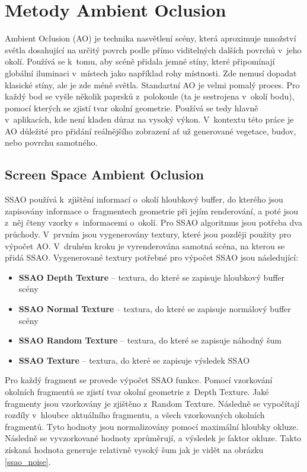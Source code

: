 \section{Metody Ambient Oclusion}
Ambient Oclusion (AO) je technika nasvětlení scény, která aproximuje množství světla dosahující na určitý povrch podle přímo viditelných dalších povrchů v~jeho okolí. Používá se k~tomu, aby scéně přidala jemné stíny, které připomínají  globální iluminaci v~místech jako například rohy místnosti. Zde nemusí dopadat klasické stíny, ale je zde méně světla. Standartní AO je velmi pomalý proces. Pro každý bod se vyšle několik paprsků z~polokoule (ta je sestrojena v~okolí bodu), pomocí kterých se zjistí tvar okolní geometrie. Používá se tedy hlavně v~aplikacích, kde není kladen důraz na vysoký výkon.
V~kontextu této práce je AO důležité pro přidání reálnějšího zobrazení ať už generované vegetace, budov, nebo povrchu samotného.


\subsection*{Screen Space Ambient Oclusion} \label{ssao-theory}
SSAO používá k~zjištění informací o~okolí hloubkový buffer, do kterého jsou zapisovány informace o~fragmentech geometrie při jejím renderování, a poté jsou z~něj čteny vzorky s~informacemi o~okolí.
Pro SSAO algoritmus jsou potřeba dva průchody. V~prvním jsou vygenerovány textury, které jsou později použity pro výpočet AO. V~druhém kroku je vyrenderována samotná scéna, na kterou se přidá SSAO. Vygenerované textury potřebné pro výpočet SSAO jsou následující:
\begin{itemize} \label{ssaotextures}
  \item \textbf{SSAO Depth Texture} -- textura, do které se zapisuje hloubkový buffer scény
  \item \textbf{SSAO Normal Texture} -- textura, do které se zapisuje normálový buffer scény
  \item \textbf{SSAO Random Texture} -- textura, do které se zapisuje náhodný šum
  \item \textbf{SSAO Texture} -- textura, do které se zapisuje výsledek SSAO
\end{itemize}

Pro každý fragment se provede výpočet SSAO funkce. Pomocí vzorkování okolních fragmentů se zjistí tvar okolní geometrie z~Depth Texture. Jaké fragmenty jsou vzorkovány je zjištěno z~Random Texture. Následně se vypočítají rozdíly v~hloubce aktuálního fragmentu, a všech vzorkovaných okolních fragmentů. Tyto hodnoty jsou normalizovány pomocí maximální hloubky okluze. Následně se vyvzorkované hodnoty zprůměrují, a výsledek je faktor okluze. Takto získaná hodnota generuje relativně vysoký šum jak je vidět na obrázku \ref{ssao_noise}.

